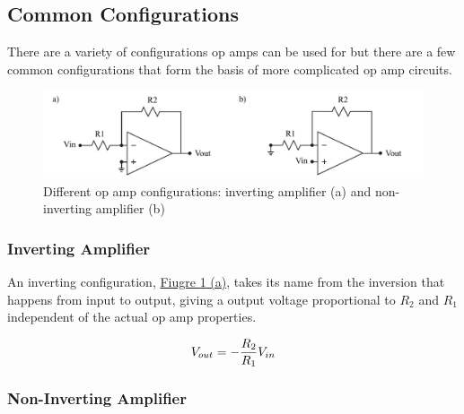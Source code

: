 \subsection{Common Configurations}

There are a variety of configurations op amps can be used for but there are a few common configurations that form the basis of more complicated op amp circuits. 

\begin{figure} [h]
	\centering
		\includegraphics[width=1\textwidth]{Lab4configs.pdf}
	\caption{Different op amp configurations: inverting amplifier (a) and non-inverting amplifier (b)} \label{fig:OAconfigs}
\end{figure}

\subsubsection{Inverting Amplifier}

An inverting configuration, \hyperref[fig:OAconfigs]{Fiugre \ref*{fig:OAconfigs} (a)}, takes its name from the inversion that happens from input to output, giving a output voltage proportional to $R_2$ and $R_1$ independent of the actual op amp properties.

\begin{equation}
	\centering
	V_{out} =-\frac{R_2}{R_1}V_{in}
\end{equation}


\subsubsection{Non-Inverting Amplifier}

